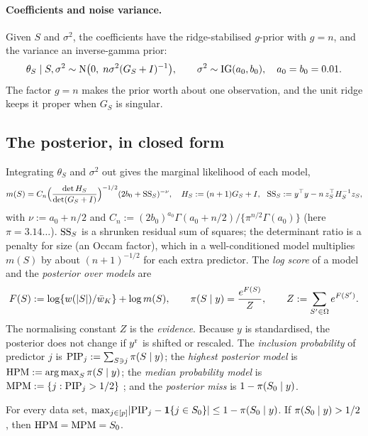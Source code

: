 \paragraph{Coefficients and noise variance.} Given $S$ and $\sigma^2$, the coefficients have the ridge-stabilised
$g$-prior \citep{Zellner1986} with $g=n$, and the variance an inverse-gamma prior:
\begin{equation}\label{eq:slab}
  \theta_S\mid S,\sigma^2\sim\mathrm{N}\big(0,\;n\sigma^2(G_S+I)^{-1}\big),\qquad \sigma^2\sim\mathrm{IG}(a_0,b_0),\quad a_0=b_0=0.01 .
\end{equation}
The factor $g=n$ makes the prior worth about one observation, and the unit ridge keeps it proper when $G_S$ is singular.

\subsection{The posterior, in closed form}\label{sec:posterior}

Integrating $\theta_S$ and $\sigma^2$ out gives the marginal likelihood of each model,
\begin{equation}\label{eq:marglik}
  m(S)=C_n\Big(\frac{\det H_S}{\det(G_S+I)}\Big)^{-1/2}(2b_0+\mathrm{SS}_S)^{-\nu},\quad
  H_S:=(n+1)G_S+I,\ \ \mathrm{SS}_S:=y^\top y-n\,z_S^\top H_S^{-1}z_S,
\end{equation}
with $\nu:=a_0+n/2$ and $C_n:=(2b_0)^{a_0}\Gamma(a_0+n/2)/\{\pi^{n/2}\Gamma(a_0)\}$ (here $\pi=3.14\ldots$). $\mathrm{SS}_S$ is a
shrunken residual sum of squares; the determinant ratio is a penalty for size (an Occam factor), which in a
well-conditioned model multiplies $m(S)$ by about $(n+1)^{-1/2}$ for each extra predictor. The \emph{log score} of a model
and the \emph{posterior over models} are
\begin{equation}\label{eq:posterior}
  F(S):=\log\{w(\lvert S\rvert)/\bar w_K\}+\log m(S),\qquad \pi(S\mid y)=\frac{e^{F(S)}}{Z},\qquad Z:=\sum_{S'\in\Omega}e^{F(S')} .
\end{equation}
The normalising constant $Z$ is the \emph{evidence}. Because $y$ is standardised, the posterior does not change if $y^{\mathrm r}$
is shifted or rescaled. The \emph{inclusion probability} of predictor $j$ is $\mathrm{PIP}_j:=\sum_{S\ni j}\pi(S\mid y)$; the
\emph{highest posterior model} is $\mathrm{HPM}:=\operatorname*{arg\,max}_S\pi(S\mid y)$; the \emph{median probability model} is
$\mathrm{MPM}:=\{j:\mathrm{PIP}_j>1/2\}$ \citep{BarbieriBerger2004}; and the \emph{posterior miss} is $1-\pi(S_0\mid y)$.

\begin{lemma}\label{lem:summaries}
For every data set, $\max_{j\in[p]}\lvert \mathrm{PIP}_j-\mathbf{1}\{j\in S_0\}\rvert\le1-\pi(S_0\mid y)$. If $\pi(S_0\mid y)>1/2$, then
$\mathrm{HPM}=\mathrm{MPM}=S_0$.
\end{lemma}


